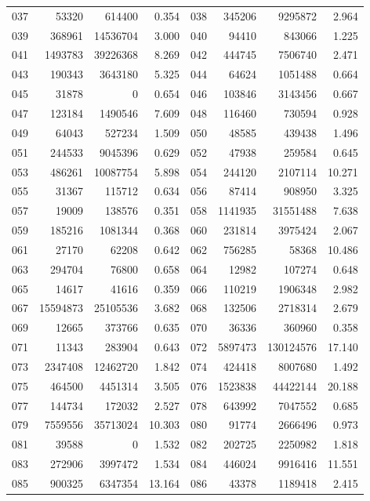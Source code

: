\begin{longtable}{lrrr@{\hspace{16bp}}lrrr}
037 & 53320 & 614400 & 0.354 & 038 & 345206 & 9295872 & 2.964\\
039 & 368961 & 14536704 & 3.000 & 040 & 94410 & 843066 & 1.225\\
041 & 1493783 & 39226368 & 8.269 & 042 & 444745 & 7506740 & 2.471\\
043 & 190343 & 3643180 & 5.325 & 044 & 64624 & 1051488 & 0.664\\
045 & 31878 & 0 & 0.654 & 046 & 103846 & 3143456 & 0.667\\
047 & 123184 & 1490546 & 7.609 & 048 & 116460 & 730594 & 0.928\\
049 & 64043 & 527234 & 1.509 & 050 & 48585 & 439438 & 1.496\\
051 & 244533 & 9045396 & 0.629 & 052 & 47938 & 259584 & 0.645\\
053 & 486261 & 10087754 & 5.898 & 054 & 244120 & 2107114 & 10.271\\
055 & 31367 & 115712 & 0.634 & 056 & 87414 & 908950 & 3.325\\
057 & 19009 & 138576 & 0.351 & 058 & 1141935 & 31551488 & 7.638\\
059 & 185216 & 1081344 & 0.368 & 060 & 231814 & 3975424 & 2.067\\
061 & 27170 & 62208 & 0.642 & 062 & 756285 & 58368 & 10.486\\
063 & 294704 & 76800 & 0.658 & 064 & 12982 & 107274 & 0.648\\
065 & 14617 & 41616 & 0.359 & 066 & 110219 & 1906348 & 2.982\\
067 & 15594873 & 25105536 & 3.682 & 068 & 132506 & 2718314 & 2.679\\
069 & 12665 & 373766 & 0.635 & 070 & 36336 & 360960 & 0.358\\
071 & 11343 & 283904 & 0.643 & 072 & 5897473 & 130124576 & 17.140\\
073 & 2347408 & 12462720 & 1.842 & 074 & 424418 & 8007680 & 1.492\\
075 & 464500 & 4451314 & 3.505 & 076 & 1523838 & 44422144 & 20.188\\
077 & 144734 & 172032 & 2.527 & 078 & 643992 & 7047552 & 0.685\\
079 & 7559556 & 35713024 & 10.303 & 080 & 91774 & 2666496 & 0.973\\
081 & 39588 & 0 & 1.532 & 082 & 202725 & 2250982 & 1.818\\
083 & 272906 & 3997472 & 1.534 & 084 & 446024 & 9916416 & 11.551\\
085 & 900325 & 6347354 & 13.164 & 086 & 43378 & 1189418 & 2.415\\

\end{longtable}
